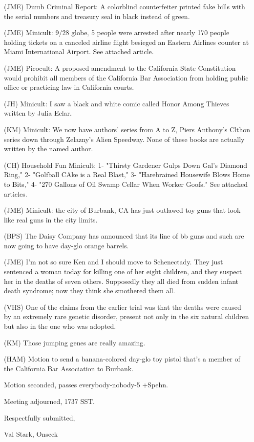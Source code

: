 \documentclass[12pt]{article}
\begin{document}
(JME) Dumb Criminal Report: A colorblind counterfeiter printed fake bills with the serial numbers and treasury seal in black instead of green.

(JME) Minicult: 9/28 globe, 5 people were arrested after nearly 170 people holding tickets on a canceled airline flight besieged an Eastern Airlines counter at Miami International Airport. See attached article.

(JME) Picocult: A proposed amendment to the California State Constitution would prohibit all members of the California Bar Association from holding public office or practicing law in California courts.

(JH) Minicult: I saw a black and white comic called Honor Among Thieves written by Julia Eclar.

(KM) Minicult: We now have authors' series from A to Z, Piers Anthony's Clthon series down through Zelazny's Alien Speedway. None of these books are actually written by the named author.

(CH) Household Fun Minicult: 1- "Thirsty Gardener Gulps Down Gal's Diamond Ring," 2- "Golfball CAke is a Real Blast," 3- "Harebrained Housewife Blows Home to Bits," 4- "270 Gallons of Oil Swamp Cellar When Worker Goofs." See attached articles.

(JME) Minicult: the city of Burbank, CA has just outlawed toy guns that look like real guns in the city limits.

(BPS) The Daisy Company has announced that its line of bb guns and such are now going to have day-glo orange barrels.

(JME) I'm not so sure Ken and I should move to Schenectady. They just sentenced a woman today for killing one of her eight children, and they suspect her in the deaths of seven others. Supposedly they all died from sudden infant death syndrome; now they think she smothered them all.

(VHS) One of the claims from the earlier trial was that the deaths were caused by an extremely rare genetic disorder, present not only in the six natural children but also in the one who was adopted.

(KM) Those jumping genes are really amazing.

(HAM) Motion to send a banana-colored day-glo toy pistol that's a member of the California Bar Association to Burbank.

Motion seconded, passes everybody-nobody-5 +Spehn.

\vspace{12pt}

\noindent
Meeting adjourned, 1737 SST.

\vspace{18pt}

\centerline{Respectfully submitted,}
\centerline{Val Stark, Onseck}
\end{document}
